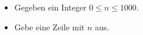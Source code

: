 \newcommand{\maxn}{1000}

\begin{frame}
    \frametitle{\problemtitle}

    \begin{itemize}
        \item Gegeben ein Integer $0\leq n\leq \maxn$.
        \item Gebe eine Zeile mit $n$ aus.
    \end{itemize}
\end{frame}
